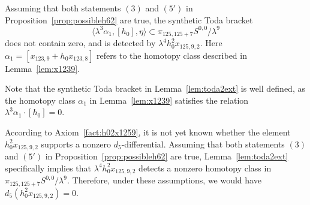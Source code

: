 \begin{lemma} \label{lem:toda2ext}
    Assuming that both statements $(3)$ and $(5')$ in Proposition~\ref{prop:possibleh62} are true, the synthetic Toda bracket
$$\langle \lambda^3 \alpha_1, [h_0], \eta \rangle \subset \pi_{125,125+7} S^{0,0}/\lambda^9$$
    does not contain zero, and is detected by $\lambda^4 h_0^2x_{125,9,2}$. Here $\alpha_1 = [x_{123,9}+h_0x_{123,8}]$ refers to the homotopy class described in Lemma~\ref{lem:x1239}.
\end{lemma}

Note that the synthetic Toda bracket in Lemma~\ref{lem:toda2ext} is well defined, as the homotopy class $\alpha_1$ in Lemma~\ref{lem:x1239} satisfies the relation $\lambda^3 \alpha_1 \cdot [h_0] = 0$.

\begin{remark} \label{rem:h02x1259}
    According to Axiom~\ref{fact:h02x1259}, it is not yet known whether the element $h_0^2x_{125,9,2}$ supports a nonzero $d_5$-differential. Assuming that both statements $(3)$ and $(5')$ in Proposition~\ref{prop:possibleh62} are true, Lemma~\ref{lem:toda2ext} specifically implies that $\lambda^4 h_0^2x_{125,9,2}$ detects a nonzero homotopy class in $\pi_{125,125+7} S^{0,0}/\lambda^9$. Therefore, under these assumptions, we would have $d_5(h_0^2x_{125,9,2}) = 0$. 
\end{remark}

